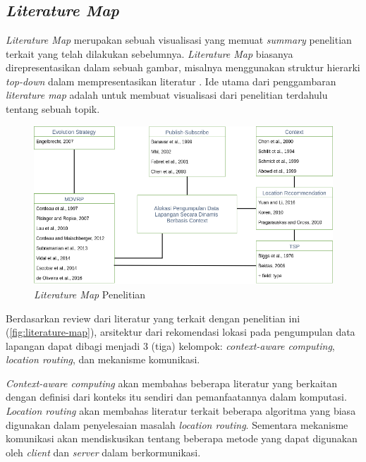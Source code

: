 \chapter{\babDua}


\section{\textit{Literature Map}}
\label{sec:literature-map}
\textit{Literature Map} merupakan sebuah visualisasi yang memuat \textit{summary} penelitian terkait yang telah dilakukan sebelumnya. \textit{Literature Map} biasanya direpresentasikan dalam sebuah gambar, misalnya menggunakan struktur hierarki \textit{top-down} dalam mempresentasikan literatur \citep{creswell_research_2013}. Ide utama dari penggambaran \textit{literature map} adalah untuk membuat visualisasi dari penelitian terdahulu tentang sebuah topik. 

\begin{figure}[!]
	\centering
	\includegraphics[width=\textwidth]{Resources/Images/literature-map}
	\caption{\textit{Literature Map} Penelitian}
	\label{fig:literature-map}
\end{figure}


Berdasarkan review dari literatur yang terkait dengan penelitian ini (\autoref{fig:literature-map}), arsitektur dari rekomendasi lokasi pada pengumpulan data lapangan dapat dibagi menjadi 3 (tiga) kelompok: \textit{context-aware computing}, \textit{location routing}, dan mekanisme komunikasi.


\textit{Context-aware computing} akan membahas beberapa literatur yang berkaitan dengan definisi dari konteks itu sendiri dan pemanfaatannya dalam komputasi. \textit{Location routing} akan membahas literatur terkait beberapa algoritma yang biasa digunakan dalam penyelesaian masalah \textit{location routing}. Sementara mekanisme komunikasi akan mendiskusikan tentang beberapa metode yang dapat digunakan oleh \textit{client} dan \textit{server} dalam berkormunikasi.


